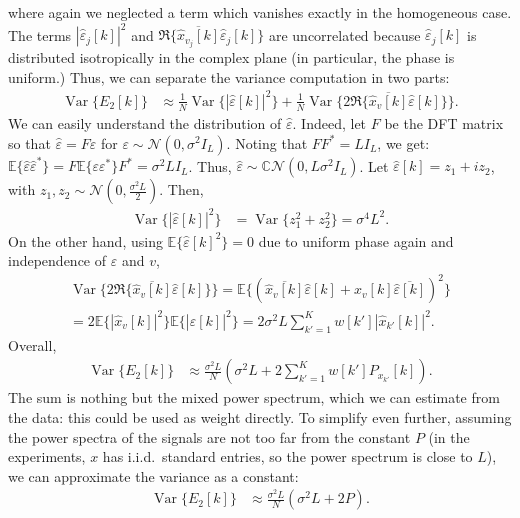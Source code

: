 \documentclass[english]{article}
\numberwithin{equation}{section}
\numberwithin{figure}{section}
\theoremstyle{plain}
\theoremstyle{definition}
\theoremstyle{remark}
\theoremstyle{plain}
\theoremstyle{remark}
\theoremstyle{plain}
\theoremstyle{plain}
\newcommand{\Var}{\operatorname{Var}}
\newcommand{\EE}{\mathbb{E}}
\begin{document}
where again we neglected a term which vanishes exactly in the homogeneous case. The terms $|\hat \varepsilon_j[k]|^2$ and $\Re\{ \overline{\hat x_{v_j}[k]} \hat \varepsilon_j[k] \}$ are uncorrelated because $\hat \varepsilon_j[k]$ is distributed isotropically in the complex plane (in particular, the phase is uniform.) Thus, we can separate the variance computation in two parts:
\begin{align*}
	\Var\{ E_2[k] \} & \approx \frac{1}{N} \Var\{ |\hat\varepsilon[k]|^2 \} + \frac{1}{N} \Var\{ 2 \Re\{ \overline{\hat x_{v}[k]} \hat \varepsilon[k] \} \}.
\end{align*}
We can easily understand the distribution of $\hat \varepsilon$. Indeed, let $F$ be the DFT matrix so that $\hat \varepsilon = F \varepsilon$ for $\varepsilon \sim \mathcal{N}(0, \sigma^2I_L)$. Noting that $FF^* = LI_L$, we get: $\EE\{ \hat\varepsilon \hat \varepsilon^* \} = F\EE\{\varepsilon \varepsilon^*\}F^* = \sigma^2 L I_L$. Thus, $\hat \varepsilon \sim \mathbb{C}\mathcal{N}(0, L\sigma^2 I_L)$.
Let $\hat \varepsilon[k] = z_1 + iz_2$, with $z_1, z_2 \sim \mathcal{N}(0, \frac{\sigma^2 L}{2})$. Then,
\begin{align*}
	\Var\{ |\hat\varepsilon[k]|^2 \} & =  \Var\{ z_1^2 + z_2^2 \} = \sigma^4 L^2.
\end{align*}
On the other hand, using $\EE\{ \hat \varepsilon[k]^2 \} = 0$ due to uniform phase again and independence of $\varepsilon$ and $v$,
\begin{multline*}
	\Var\{ 2 \Re\{ \overline{\hat x_{v}[k]} \hat \varepsilon[k] \} \} = \EE\{ ( \overline{\hat x_{v}[k]} \hat \varepsilon[k] + \hat x_{v}[k] \overline{\hat \varepsilon[k]} )^2 \} \\
			= 2\EE\{ |\hat x_{v}[k]|^2\} \EE\{ |\hat \varepsilon[k]|^2  \}
			 = 2\sigma^2 L \sum_{k'=1}^K w[k'] |\hat x_{k'}[k]|^2.
\end{multline*}
Overall,
\begin{align*}
	\Var\{ E_2[k] \} & \approx \frac{\sigma^2 L}{N}\left( \sigma^2 L + 2 \sum_{k'=1}^{K} w[k'] P_{x_{k'}}[k] \right).
\end{align*}
The sum is nothing but the mixed power spectrum, which we can estimate from the data: this could be used as weight directly. To simplify even further, assuming the power spectra of the signals are not too far from the constant $P$ (in the experiments, $x$ has i.i.d.\ standard entries, so the power spectrum is close to $L$), we can approximate the variance as a constant:
\begin{align*}
	\Var\{ E_2[k] \} & \approx \frac{\sigma^2 L}{N}\left( \sigma^2 L + 2P \right).
\end{align*}
\end{document}
